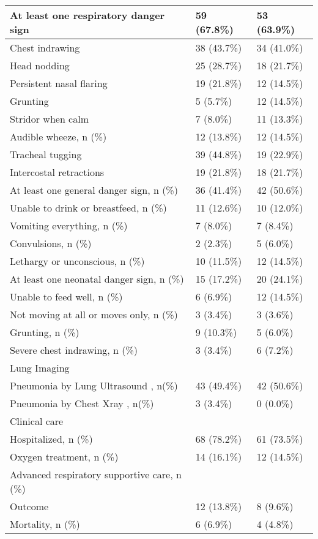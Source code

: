 \documentclass[
]{article}
\begin{document}
\begin{table}[H]
\begin{tabular}[t]{l|l|l}
\hline
At least one respiratory danger sign & 59 (67.8\%) & 53 (63.9\%)\\
\hline
Chest indrawing & 38 (43.7\%) & 34 (41.0\%)\\
\hline
Head nodding & 25 (28.7\%) & 18 (21.7\%)\\
\hline
Persistent nasal flaring & 19 (21.8\%) & 12 (14.5\%)\\
\hline
Grunting & 5  (5.7\%) & 12 (14.5\%)\\
\hline
Stridor when calm & 7  (8.0\%) & 11 (13.3\%)\\
\hline
Audible wheeze, n (\%) & 12 (13.8\%) & 12 (14.5\%)\\
\hline
Tracheal tugging & 39 (44.8\%) & 19 (22.9\%)\\
\hline
Intercostal retractions & 19 (21.8\%) & 18 (21.7\%)\\
\hline
At least one general danger sign, n (\%) & 36 (41.4\%) & 42 (50.6\%)\\
\hline
Unable to drink or breastfeed, n (\%) & 11 (12.6\%) & 10 (12.0\%)\\
\hline
Vomiting everything, n (\%) & 7  (8.0\%) & 7  (8.4\%)\\
\hline
Convulsions, n (\%) & 2  (2.3\%) & 5  (6.0\%)\\
\hline
Lethargy or unconscious, n (\%) & 10 (11.5\%) & 12 (14.5\%)\\
\hline
At least one neonatal danger sign, n (\%) & 15 (17.2\%) & 20 (24.1\%)\\
\hline
Unable to feed well, n (\%) & 6  (6.9\%) & 12 (14.5\%)\\
\hline
Not moving at all or moves only, n (\%) & 3  (3.4\%) & 3  (3.6\%)\\
\hline
Grunting, n (\%) & 9 (10.3\%) & 5  (6.0\%)\\
\hline
Severe chest indrawing, n (\%) & 3  (3.4\%) & 6  (7.2\%)\\
\hline
Lung Imaging &  & \\
\hline
\hspace{1em}Pneumonia by Lung Ultrasound , n(\%) & 43 (49.4\%) & 42 (50.6\%)\\
\hline
\hspace{1em}Pneumonia by Chest Xray , n(\%) & 3  (3.4\%) & 0   (0.0\%)\\
\hline
Clinical care &  & \\
\hline
\hspace{1em}Hospitalized, n (\%) & 68 (78.2\%) & 61 (73.5\%)\\
\hline
\hspace{1em}Oxygen treatment, n (\%) & 14 (16.1\%) & 12 (14.5\%)\\
\hline
\hspace{1em}Advanced respiratory supportive care, n (\%) &  & \\
\hline
Outcome & 12 (13.8\%) & 8  (9.6\%)\\
\hline
\hspace{1em}Mortality, n (\%) & 6  (6.9\%) & 4  (4.8\%)\\
\hline
\end{tabular}
\end{table}
\newpage
\end{document}
